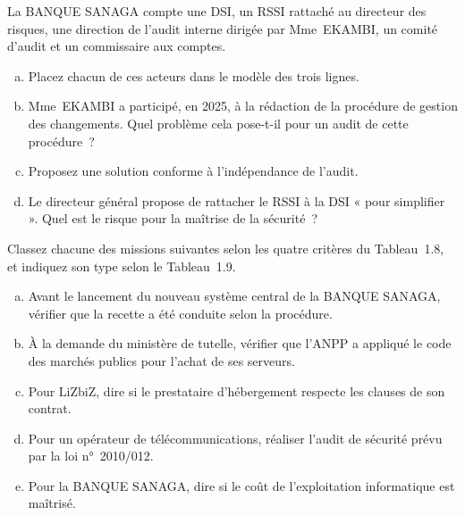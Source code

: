 \begin{boxexo}[title={\ding{45}\quad Exercice~1.5. Les trois lignes de la BANQUE SANAGA \niveaumoyen}]
La BANQUE SANAGA compte une DSI, un RSSI rattaché au directeur des
risques, une direction de l'audit interne dirigée par Mme~EKAMBI, un
comité d'audit et un commissaire aux comptes.
\begin{enumerate}[(a)]
    \item Placez chacun de ces acteurs dans le modèle des trois lignes.
    \item Mme~EKAMBI a participé, en 2025, à la rédaction de la procédure de
          gestion des changements. Quel problème cela pose-t-il pour un
          audit de cette procédure~?
    \item Proposez une solution conforme à l'indépendance de l'audit.
    \item Le directeur général propose de rattacher le RSSI à la DSI « pour
          simplifier ». Quel est le risque pour la maîtrise de la
          sécurité~?
\end{enumerate}
\end{boxexo}

\begin{boxexo}[title={\ding{45}\quad Exercice~1.6. Classer cinq missions \niveaumoyen}]
Classez chacune des missions suivantes selon les quatre critères du
Tableau~1.8, et indiquez son type selon le Tableau~1.9.
\begin{enumerate}[(a)]
    \item Avant le lancement du nouveau système central de la BANQUE
          SANAGA, vérifier que la recette a été conduite selon la procédure.
    \item À la demande du ministère de tutelle, vérifier que l'ANPP a
          appliqué le code des marchés publics pour l'achat de ses serveurs.
    \item Pour LiZbiZ, dire si le prestataire d'hébergement respecte les
          clauses de son contrat.
    \item Pour un opérateur de télécommunications, réaliser l'audit de
          sécurité prévu par la loi n°~2010/012.
    \item Pour la BANQUE SANAGA, dire si le coût de l'exploitation
          informatique est maîtrisé.
\end{enumerate}
\end{boxexo}

